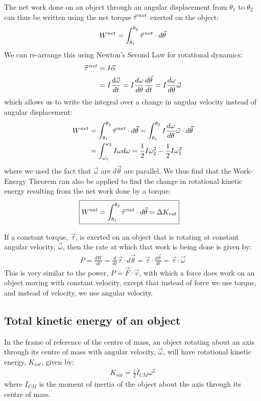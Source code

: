 The net work done on an object through an angular displacement from $\theta_1$ to $\theta_2$ can thus be written using the net torque $\pvec \tau^{net}$ exerted on the object:
\begin{align*}
W^{net} = \int_{\theta_1}^{\theta_2}\pvec\tau^{net}\cdot d\vec \theta
\end{align*}
We can re-arrange this using Newton's Second Law for rotational dynamics:
\begin{align*}
\pvec\tau^{net} &= I \vec\alpha\\
&= I \frac{d\vec\omega}{dt} =  I \frac{d\omega}{d\theta}\frac{d\vec\theta}{dt}=I \frac{d\omega}{d\theta} \vec\omega
\end{align*}
which allows us to write the integral over a change in angular velocity instead of angular displacement:
\begin{align*}
W^{net} &= \int_{\theta_1}^{\theta_2}\pvec\tau^{net}\cdot d\vec \theta =  \int_{\theta_1}^{\theta_2}I \frac{d\omega}{d\theta} \vec\omega \cdot d\vec \theta\\
&=\int_{\omega_1}^{\omega_2}I \omega d\omega = \frac{1}{2}I\omega_2^2 - \frac{1}{2}I\omega_1^2
\end{align*}
where we used the fact that $\vec\omega$ are $d\vec\theta$ are parallel. We thus find that the Work-Energy Theorem can also be applied to find the change in rotational kinetic energy resulting from the net work done by a torque:
\begin{align}
\Aboxed{W^{net}=\int_{\theta_1}^{\theta_2}\pvec\tau^{net}\cdot d\vec \theta = \Delta K_{rot}}
\end{align}

If a constant torque, $\vec\tau$, is exerted on an object that is rotating at constant angular velocity, $\vec\omega$, then the rate at which that work  is being done is given by:
\begin{align*}
P = \frac{dW}{dt} = \frac{d}{dt} \vec \tau \cdot d\vec\theta =  \vec \tau \cdot \frac{d\vec\theta}{dt} = \vec \tau \cdot \vec\omega
\end{align*}
This is very similar to the power, $P=\vec F\cdot \vec v$, with which a force does work on an object moving with constant velocity, except that instead of force we use torque, and instead of velocity, we use angular velocity. 

\subsection{Total kinetic energy of an object}
In the frame of reference of the centre of mass, an object rotating about an axis through its centre of mass with angular velocity, $\vec \omega$, will have rotational kinetic energy, $K_{rot}$, given by:
\begin{align*}
K_{rot}=\frac{1}{2}I_{CM}\omega^2
\end{align*}
where $I_{CM}$ is the moment of inertia of the object about the axis through its centre of mass. 

